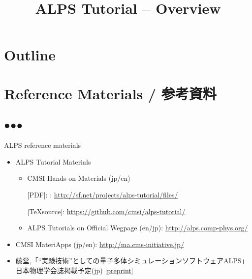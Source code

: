 
\title{ALPS Tutorial -- Overview}




\begin{frame}
  \titlepage
\end{frame}

\section*{Outline}
\begin{frame}[t,fragile]
  \tableofcontents
\end{frame}

\section{Reference Materials / 参考資料}
\subsection*{{\protect\color{red}●}{\protect\color{blue}●}{\protect\color{green}●}}

\begin{frame}[t,fragile]{ALPS reference materials}
  \begin{itemize}
    \setlength{\itemsep}{1em}
  \item ALPS Tutorial Materials
    \begin{itemize}
    \item CMSI Hands-on Materials (jp/en)
      
      [PDF]: : {\footnotesize \url{http://sf.net/projects/alps-tutorial/files/}}
      
      [\TeX source]: {\footnotesize \url{https://github.com/cmsi/alps-tutorial/}}
      
    \item ALPS Tutorials on Official Wegpage (en/jp): {\footnotesize \url{http://alps.comp-phys.org/}}
    \end{itemize}
  \item CMSI MateriApps (jp/en): {\footnotesize \url{http://ma.cms-initiative.jp/}}
  \item 藤堂,「``実験技術''としての量子多体シミュレーションソフトウェアALPS」日本物理学会誌掲載予定(jp) \href{http://exa.phys.s.u-tokyo.ac.jp/archive/alps-jps-2015.pdf}{\footnotesize [preprint]}
  \end{itemize}
\end{frame}

